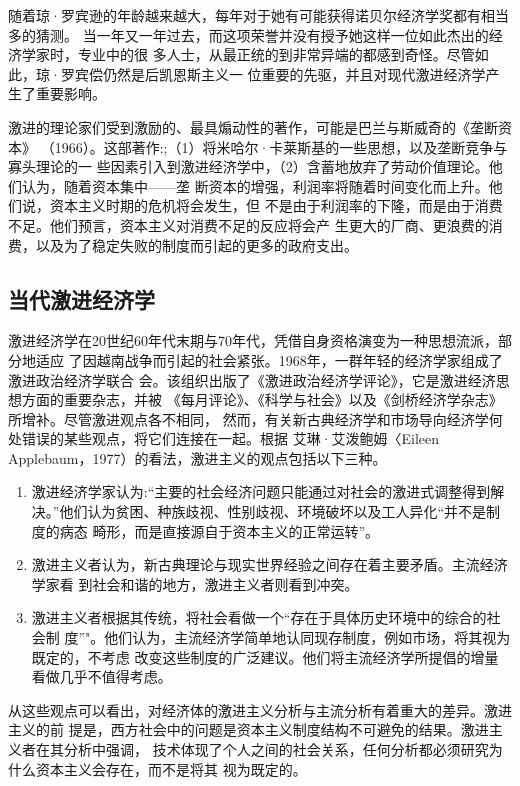 随着琼·罗宾逊的年龄越来越大，每年对于她有可能获得诺贝尔经济学奖都有相当多的猜测。
当一年又一年过去，而这项荣誉并没有授予她这样一位如此杰出的经济学家时，专业中的很
多人士，从最正统的到非常异端的都感到奇怪。尽管如此，琼·罗宾偿仍然是后凯恩斯主义一
位重要的先驱，并且对现代激进经济学产生了重要影响。

激进的理论家们受到激励的、最具煽动性的著作，可能是巴兰与斯威奇的《垄断资本》
（1966）。这部著作:;（1）将米哈尔·卡莱斯基的一些思想，以及垄断竞争与寡头理论的一
些因素引入到激进经济学中，（2）含蓄地放弃了劳动价值理论。他们认为，随着资本集中——垄
断资本的增强，利润率将随着时间变化而上升。他们说，资本主义时期的危机将会发生，但
不是由于利润率的下隆，而是由于消费不足。他们预言，资本主义对消费不足的反应将会产
生更大的厂商、更浪费的消费，以及为了稳定失败的制度而引起的更多的政府支出。

\subsection{当代激进经济学}

激进经济学在20世纪60年代末期与70年代，凭借自身资格演变为一种思想流派，部分地适应
了因越南战争而引起的社会紧张。1968年，一群年轻的经济学家组成了激进政治经济学联合
会。该组织出版了《激进政治经济学评论》，它是激进经济思想方面的重要杂志，并被
《每月评论》、《科学与社会》以及《剑桥经济学杂志》所增补。尽管激进观点各不相同，
然而，有关新古典经济学和市场导向经济学何处错误的某些观点，将它们连接在一起。根据
艾琳·艾泼鲍姆〈Eileen Applebaum，1977）的看法，激进主义的观点包括以下三种。

\begin{enumerate}[（1）]
\item 激进经济学家认为:“主要的社会经济问题只能通过对社会的激进式调整得到解
  决。”他们认为贫困、种族歧视、性别歧视、环境破坏以及工人异化“并不是制度的病态
  畸形，而是直接源自于资本主义的正常运转”。

\item 激进主义者认为，新古典理论与现实世界经验之间存在着主要矛盾。主流经济学家看
  到社会和谐的地方，激进主义者则看到冲突。

\item 激进主义者根据其传统，将社会看做一个“存在于具体历史环境中的综合的社会制
  度”"。他们认为，主流经济学简单地认同现存制度，例如市场，将其视为既定的，不考虑
  改变这些制度的广泛建议。他们将主流经济学所提倡的增量看做几乎不值得考虑。
\end{enumerate}

从这些观点可以看出，对经济体的激进主义分析与主流分析有着重大的差异。激进主义的前
提是，西方社会中的问题是资本主义制度结构不可避免的结果。激进主义者在其分析中强调，
技术体现了个人之间的社会关系，任何分析都必须研究为什么资本主义会存在，而不是将其
视为既定的。

